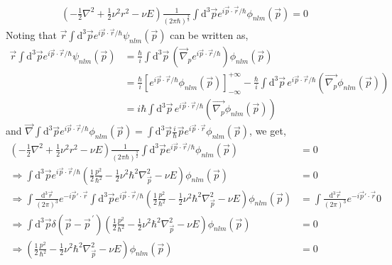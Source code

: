 \documentclass[10pt]{article}
\begin{document}
\begin{align*}
\left( -\frac{1}{2} \nabla^{2} + \frac{1}{2} \nu^{2} r^{2} - \nu E  \right) \frac{1}{(2\pi \hbar)^{\frac{3}{2}}} \int \textrm{d}^{3} \vec{p} e^{i \vec{p} \cdot \vec{r} / \hbar} \phi_{n l m}(\vec{p}) = 0
\end{align*}
Noting that $\vec{r} \int \textrm{d}^{3} \vec{p} e^{i \vec{p} \cdot \vec{r} / \hbar} \psi_{n l m}(\vec{p})$ can be written as,
\begin{align*}
\vec{r} \int \textrm{d}^{3} \vec{p} e^{i \vec{p} \cdot \vec{r}/ \hbar} \psi_{n l m}(\vec{p}) &= \frac{\hbar}{i} \int \text{d}^{3} \vec{p} \, \left( \vec{\nabla}_{p} e^{i \vec{p} \cdot \vec{r}/ \hbar} \right) \phi_{n l m}(\vec{p}) \\
	&= \frac{\hbar}{i} \left[ e^{i \vec{p} \cdot \vec{r}/ \hbar } \phi_{ n l m}(\vec{p}) \right]^{+\infty}_{-\infty} - \frac{\hbar}{i}\int \text{d}^{3} \vec{p} \,  e^{i \vec{p} \cdot \vec{r} / \hbar} \left( \vec{\nabla_{p}} \phi_{n l m}(\vec{p}) \right) \\
	&= i \hbar \int \text{d}^{3} \vec{p} \,  e^{i \vec{p} \cdot \vec{r} / \hbar} \left( \vec{\nabla_{p}} \phi_{n l m}(\vec{p}) \right)
\end{align*}
and $\vec{\nabla} \int \textrm{d}^{3} \vec{p} e^{i \vec{p} \cdot \vec{r}/ \hbar} \phi_{n l m}(\vec{p}) = \int \textrm{d}^{3} \vec{p} \frac{i}{\hbar} \vec{p} e^{i \vec{p} \cdot \vec{r}} \phi_{n l m}(\vec{p}) $, we get,
\begin{align*}
\left( -\frac{1}{2} \nabla^{2} + \frac{1}{2} \nu^{2} r^{2} - \nu E  \right) \frac{1}{(2\pi \hbar)^{\frac{3}{2}}} \int \textrm{d}^{3} \vec{p} e^{i \vec{p} \cdot \vec{r}/ \hbar} \phi_{n l m}(\vec{p}) &= 0 \\
\Rightarrow \int \textrm{d}^{3} \vec{p} e^{i \vec{p} \cdot \vec{r}/ \hbar} \left( \frac{1}{2} \frac{p^{2}}{\hbar^{2}} - \frac{1}{2} \nu^{2} \hbar^{2} \nabla^{2}_{\vec{p}} - \nu E  \right) \phi_{n l m}(\vec{p}) &= 0 \\
\Rightarrow \int \frac{\text{d}^{3} \vec{r}}{(2\pi)^{3}} e^{-i \vec{p}' \cdot \vec{r}} \int \textrm{d}^{3} \vec{p} e^{i \vec{p} \cdot \vec{r}/ \hbar} \left( \frac{1}{2} \frac{p^{2}}{\hbar^{2}} - \frac{1}{2} \nu^{2} \hbar^{2} \nabla^{2}_{\vec{p}} - \nu E  \right) \phi_{n l m}(\vec{p}) &= \int \frac{\text{d}^{3} \vec{r}}{(2\pi)^{3}} e^{-i \vec{p}' \cdot \vec{r}} 0 \\
\Rightarrow  \int \textrm{d}^{3} \vec{p} \delta(\vec{p} - \vec{p}^{\, \prime}) \left( \frac{1}{2} \frac{p^{2}}{\hbar^{2}} - \frac{1}{2} \nu^{2} \hbar^{2} \nabla^{2}_{\vec{p}} - \nu E  \right) \phi_{n l m}(\vec{p}) &= 0 \\
\Rightarrow  \left( \frac{1}{2} \frac{p^{2}}{\hbar^{2}} - \frac{1}{2} \nu^{2} \hbar^{2} \nabla^{2}_{\vec{p}} - \nu E  \right) \phi_{n l m}(\vec{p}) &= 0
\end{align*}
\end{document}
